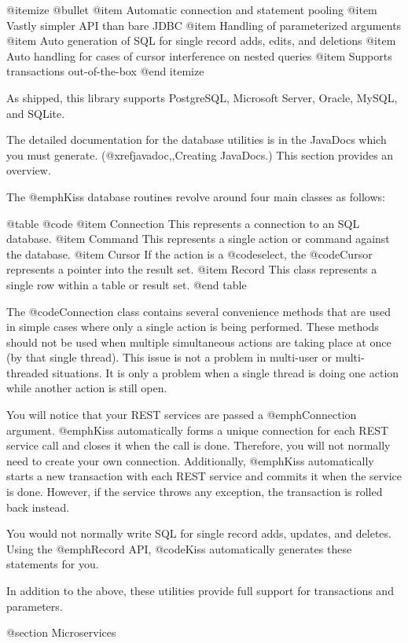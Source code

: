 @itemize @bullet
@item
Automatic connection and statement pooling
@item
Vastly simpler API than bare JDBC
@item
Handling of parameterized arguments
@item 
Auto generation of SQL for single record adds, edits, and deletions
@item
Auto handling for cases of cursor interference on nested queries
@item
Supports transactions out-of-the-box
@end itemize

As shipped, this library supports PostgreSQL, Microsoft Server,
Oracle, MySQL, and SQLite.

The detailed documentation for the database utilities is in the
JavaDocs which you must generate. (@xref{javadoc,,Creating JavaDocs}.)
This section provides an overview.

The @emph{Kiss} database routines revolve around four main classes as follows:

@table @code
@item Connection
This represents a connection to an SQL database.
@item Command
This represents a single action or command against the database.
@item Cursor
If the action is a @code{select}, the @code{Cursor} represents a
pointer into the result set.
@item Record
This class represents a single row within a table or result set.
@end table

The @code{Connection} class contains several convenience methods that
are used in simple cases where only a single action is being
performed.  These methods should not be used when multiple
simultaneous actions are taking place at once (by that single thread).
This issue is not a problem in multi-user or multi-threaded
situations.  It is only a problem when a single thread is doing one
action while another action is still open.

You will notice that your REST services are passed a @emph{Connection}
argument.  @emph{Kiss} automatically forms a unique connection for
each REST service call and closes it when the call is done.
Therefore, you will not normally need to create your own connection.
Additionally, @emph{Kiss} automatically starts a new transaction with
each REST service and commits it when the service is done.  However,
if the service throws any exception, the transaction is rolled back
instead.

You would not normally write SQL for single record adds, updates, and
deletes.  Using the @emph{Record} API, @code{Kiss} automatically
generates these statements for you.

In addition to the above, these utilities provide full support for transactions and parameters.

@section Microservices

